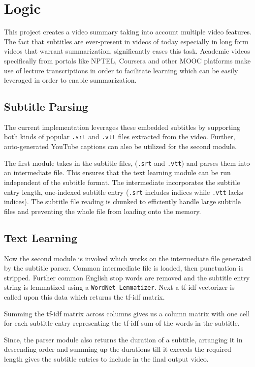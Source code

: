 \documentclass{article}
\begin{document}
	\section{Logic}
		This project creates a video summary taking into account multiple video features. The fact that subtitles are ever-present in videos of today especially in long form videos that warrant summarization, significantly eases this task. Academic videos specifically from portals like NPTEL, Coursera and other MOOC platforms make use of lecture transcriptions in order to facilitate learning which can be easily leveraged in order to enable summarization. 
			
		\subsection{Subtitle Parsing}	
			The current implementation leverages these embedded subtitles by supporting both kinds of popular \verb|.srt| and \verb|.vtt| files extracted from the video. Further, auto-generated YouTube captions can also be utilized for the second module.
			
			The first module takes in the subtitle files, (\verb|.srt| and \verb|.vtt|) and parses them into an intermediate file. This ensures that the text learning module can be run independent of the subtitle format. The intermediate incorporates the subtitle entry length, one-indexed subtitle entry (\verb|.srt| includes indices while \verb|.vtt| lacks indices). The subtitle file reading is chunked to efficiently handle large subtitle files and preventing the whole file from loading onto the memory.
			
		\subsection{Text Learning}
			Now the second module is invoked which works on the intermediate file generated by the subtitle parser. Common intermediate file is loaded, then punctuation is stripped. Further common English stop words are removed and the subtitle entry string is lemmatized using a \verb|WordNet Lemmatizer|. Next a tf-idf vectorizer is called upon this data which returns the tf-idf matrix.
			
			Summing the tf-idf matrix across columns gives us a column matrix with one cell for each subtitle entry representing the tf-idf sum of the words in the subtitle.
			
			Since, the parser module also returns the duration of a subtitle, arranging it in descending order and summing up the durations till it exceeds the required length gives the subtitle entries to include in the final output video. 
			
\end{document}
